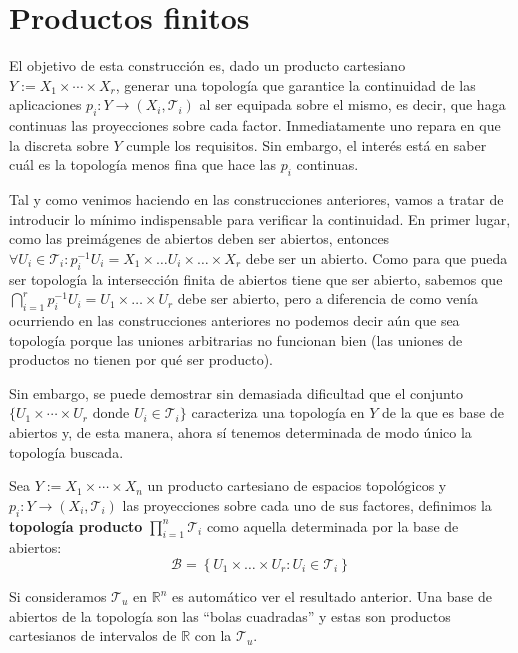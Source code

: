 \section{Productos finitos}%
\label{sec:productos_finitos_}
El objetivo de esta construcción es, dado un producto cartesiano $Y := X_1 \times \cdots \times X_r$, generar una topología que garantice la continuidad de las aplicaciones $p_i: Y \rightarrow \left( X_i, \mathcal{T}_i \right)$ al ser equipada sobre el mismo, es decir, que haga continuas las proyecciones sobre cada factor. Inmediatamente uno repara en que la discreta sobre $Y$ cumple los requisitos. Sin embargo, el interés está en saber cuál es la topología menos fina que hace las $p_i$ continuas.

Tal y como venimos haciendo en las construcciones anteriores, vamos a tratar de introducir lo mínimo indispensable para verificar la continuidad. En primer lugar, como las preimágenes de abiertos deben ser abiertos, entonces $\forall U_i \in \mathcal{T}_i : p_i^{-1}U_i = X_1 \times \ldots U_i \times \ldots \times X_r $ debe ser un abierto. Como para que pueda ser topología la intersección finita de abiertos tiene que ser abierto, sabemos que $\bigcap_{i=1}^{r} p_i^{-1}U_i = U_1 \times \ldots \times U_r$ debe ser abierto, pero a diferencia de como venía ocurriendo en las construcciones anteriores no podemos decir aún que sea topología porque las uniones arbitrarias no funcionan bien (las uniones de productos no tienen por qué ser producto). 

Sin embargo, se puede demostrar sin demasiada dificultad que el conjunto  $\{U_1 \times \cdots \times U_r \mbox{ donde } U_i \in \mathcal{T}_i\}$ caracteriza una topología en $Y$ de la que es base de abiertos y, de esta manera, ahora sí tenemos determinada de modo único la topología buscada.

\begin{defi}
Sea $Y := X_1\times \cdots \times X_n$ un producto cartesiano de espacios topológicos y $p_i : Y \rightarrow (X_i, \mathcal{T}_i)$ las proyecciones sobre cada uno de sus factores, definimos la \textbf{topología producto} $\prod_{i=1}^n \mathcal{T}_i$ como aquella determinada por la base de abiertos:
\[
\mathcal{B} = \left\{ U_1 \times \ldots \times U_r: U_i \in \mathcal{T}_i \right\}
\]
\end{defi}

\begin{ej}
Si consideramos $\mathcal{T}_u$ en $\mathbb{R}^n$ es automático ver el resultado anterior. Una base de abiertos de la topología son las ``bolas cuadradas'' y estas son productos cartesianos de intervalos de $\mathbb{R}$ con la $\mathcal{T}_u$.
\end{ej}

